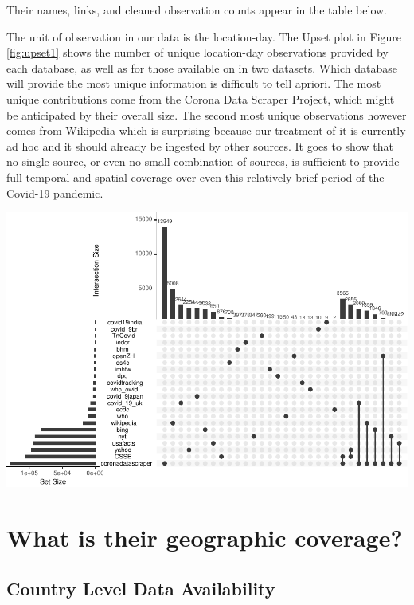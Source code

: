 \documentclass[
]{book}
\begin{document}
Their names, links, and cleaned observation counts appear in the table below.

\hypertarget{htmlwidget-aacebf49db45410ecfd2}{}

The unit of observation in our data is the location-day. The Upset plot in Figure \ref{fig:upset1} shows the number of unique location-day observations provided by each database, as well as for those available on in two datasets. Which database will provide the most unique information is difficult to tell apriori. The most unique contributions come from the Corona Data Scraper Project, which might be anticipated by their overall size. The second most unique observations however comes from Wikipedia which is surprising because our treatment of it is currently ad hoc and it should already be ingested by other sources. It goes to show that no single source, or even no small combination of sources, is sufficient to provide full temporal and spatial coverage over even this relatively brief period of the Covid-19 pandemic.

\begin{center}\includegraphics[width=1\linewidth]{HowToBeCarefulWithCovid19Counts_files/figure-latex/upset1-1} \end{center}

\hypertarget{what-is-their-geographic-coverage}{%
\section{What is their geographic coverage?}\label{what-is-their-geographic-coverage}}

\hypertarget{country-level-data-availability}{%
\subsection{Country Level Data Availability}\label{country-level-data-availability}}
\end{document}
